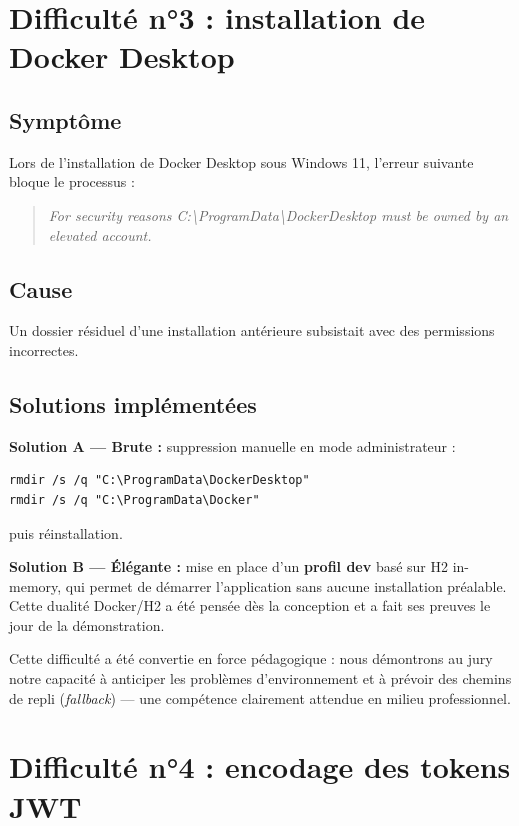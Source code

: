 \documentclass[11pt,a4paper,oneside]{report}
\begin{document}
\section{Difficulté n°3 : installation de Docker Desktop}

\subsection{Symptôme}
Lors de l'installation de Docker Desktop sous Windows 11, l'erreur
suivante bloque le processus :
\begin{quote}\itshape
For security reasons C:\textbackslash ProgramData\textbackslash DockerDesktop must be owned
by an elevated account.
\end{quote}

\subsection{Cause}
Un dossier résiduel d'une installation antérieure subsistait avec des
permissions incorrectes.

\subsection{Solutions implémentées}

\textbf{Solution A — Brute :} suppression manuelle en mode administrateur :
\begin{lstlisting}[style=shellstyle]
rmdir /s /q "C:\ProgramData\DockerDesktop"
rmdir /s /q "C:\ProgramData\Docker"
\end{lstlisting}
puis réinstallation.

\textbf{Solution B — Élégante :} mise en place d'un \textbf{profil dev}
basé sur H2 in-memory, qui permet de démarrer l'application sans aucune
installation préalable. Cette dualité Docker/H2 a été pensée dès la
conception et a fait ses preuves le jour de la démonstration.

\begin{tipbox}
Cette difficulté a été convertie en force pédagogique : nous démontrons
au jury notre capacité à anticiper les problèmes d'environnement et à
prévoir des chemins de repli (\textit{fallback}) — une compétence
clairement attendue en milieu professionnel.
\end{tipbox}

\section{Difficulté n°4 : encodage des tokens JWT}
\end{document}
